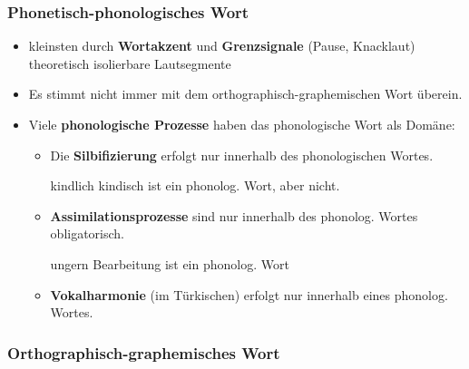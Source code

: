 \begin{frame}
\frametitle{Phonetisch-phonologisches Wort}

\begin{itemize}
	\item kleinsten durch \textbf{Wortakzent} und \textbf{Grenzsignale} (Pause, Knacklaut) theoretisch isolierbare Lautsegmente
	\item Es stimmt nicht immer mit dem orthographisch-graphemischen Wort überein.

\pause 
	
	\item Viele \textbf{phonologische Prozesse} haben das phonologische Wort als Domäne:
	
	\begin{itemize}
		\item Die \textbf{Silbifizierung} erfolgt nur innerhalb des phonologischen Wortes.
		
		\ea kindlich \vs kindisch  ist ein phonolog. Wort, aber  nicht.
		\z 

\pause 

		\item \textbf{Assimilationsprozesse} sind nur innerhalb des phonolog. Wortes obligatorisch.
		
		\ea ungern \vs Bearbeitung  ist ein phonolog. Wort
		\z 

\pause 
		
		\item \textbf{Vokalharmonie} (\zB im Türkischen) erfolgt nur innerhalb eines phonolog. Wortes.
	\end{itemize}
\end{itemize}

\end{frame}


\subsubsection{Orthographisch-graphemisches Wort}


